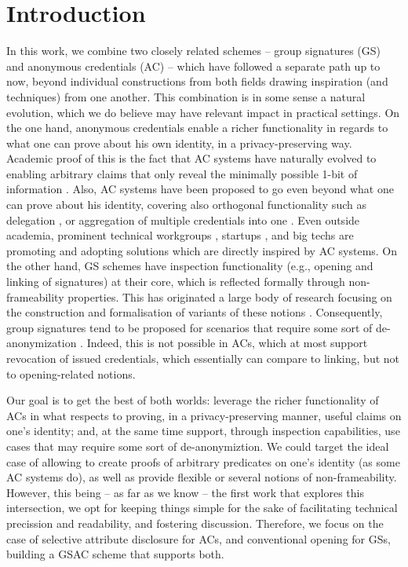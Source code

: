 \section{Introduction}
\label{sec:introduction}

In this work, we combine two closely related schemes -- group signatures (GS)
and anonymous credentials (AC) -- which have followed a
separate path up to now, beyond individual constructions from both fields
drawing inspiration (and techniques) from one another. This combination is in
some sense a natural evolution, which we do believe may have relevant impact in
practical settings. On the one hand, anonymous credentials enable a richer
functionality in regards to what one can prove about his own identity, in a
privacy-preserving way. Academic proof of this is the fact that AC systems have
naturally evolved to enabling arbitrary claims that only reveal the minimally
possible 1-bit of information \needcite. Also, AC systems have been proposed to
go even beyond what one can prove about his identity, covering also orthogonal
functionality such as delegation \needcite, or aggregation of multiple
credentials into one \needcite. Even outside academia, prominent
technical workgroups \needcite, startups \needcite, and big techs \needcite are
promoting and adopting solutions which are directly inspired by AC systems. On
the other hand, GS 
schemes have inspection functionality (e.g., opening and linking of signatures)
at their core, which is reflected formally through non-frameability properties.
This has originated a large body of research focusing on the construction and
formalisation of variants of these notions \needcite. Consequently, group
signatures tend to be proposed for scenarios that require some sort of
de-anonymization \needcite. Indeed, this is not possible in ACs, which at most
support revocation of issued credentials, which essentially can compare to
linking, but not to opening-related notions.

Our goal is to get the best of both worlds: leverage the richer functionality
of ACs in what respects to proving, in a privacy-preserving manner, useful
claims on one's identity; and, at the same time support, through inspection
capabilities, use cases that may require some sort of de-anonymiztion. We
could target the ideal case of allowing to create proofs of arbitrary predicates
on one's identity (as some AC systems do), as well as provide flexible or several
notions of non-frameability. However, this being -- as far as we know -- the
first work that explores this intersection, we opt for keeping things simple
for the sake of facilitating technical precission and readability, and fostering
discussion. Therefore, we focus on the case of selective attribute disclosure
for ACs, and conventional opening for GSs, building a GSAC scheme that supports
both. 

